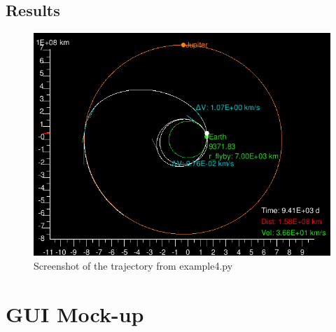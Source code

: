 \documentclass[a4paper,11pt]{article}
\begin{document}
\subsection{Results}
\begin{figure}[h!]
\centering
\includegraphics[width=1\textwidth]{img/example4}
\caption{Screenshot of the trajectory from example4.py}
\label{img:example4}
\end{figure}



\section{GUI Mock-up}

\end{document}
